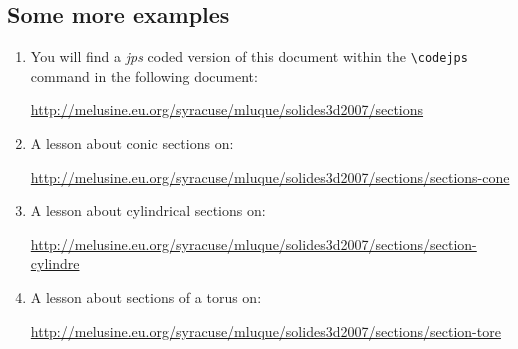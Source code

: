 \subsection{Some more examples}
\begin{enumerate}
\item
You will find a \textit{jps} coded version of this document
within the \verb+\codejps+ command in the following document:

\centerline{\url{http://melusine.eu.org/syracuse/mluque/solides3d2007/sections}}
\item A lesson about conic sections on:

\centerline{\url{http://melusine.eu.org/syracuse/mluque/solides3d2007/sections/sections-cone}}
\item A lesson about cylindrical sections on:

\centerline{\url{http://melusine.eu.org/syracuse/mluque/solides3d2007/sections/section-cylindre}}
\item A lesson about sections of a torus on:

\centerline{\url{http://melusine.eu.org/syracuse/mluque/solides3d2007/sections/section-tore}}
\end{enumerate}


\endinput
